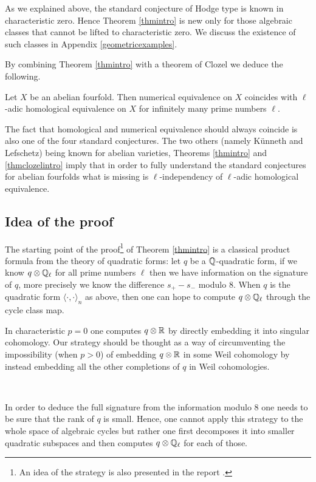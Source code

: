 \documentclass[11pt]{amsart}
\begin{document}
\begin{remark}\label{remintro}
As we explained above, the standard conjecture of Hodge type is known in characteristic zero. Hence Theorem \ref{thmintro} is new only   for those algebraic classes that cannot be lifted to characteristic zero. We discuss the existence of such classes in  Appendix \ref{geometricexamples}.
\end{remark}


By combining Theorem \ref{thmintro} with  a theorem of Clozel  \cite{Clozel} we deduce the following.
\begin{theorem}\label{thmclozelintro}
Let $X$ be an   abelian fourfold. Then numerical equivalence on $X$ coincides with $\ell$-adic homological equivalence on $X$ for infinitely many prime numbers $\ell$. 
\end{theorem}
The fact that homological and numerical equivalence should always coincide is also one   of the four standard conjectures. The two others (namely K\"unneth and Lefschetz) being known for abelian varieties, Theorems \ref{thmintro} and \ref{thmclozelintro} imply that in order to fully understand the standard conjectures for abelian fourfolds what is missing is $\ell$-independency of $\ell$-adic homological equivalence.

\subsection*{Idea of the proof}
The starting point of the proof\footnote{An idea of the strategy is also presented in the report  \cite{Ober}.} of Theorem \ref{thmintro} is a classical product formula from the theory of quadratic forms: let $q$ be a $\mathbb{Q}$-quadratic form, if we know  $q \otimes \mathbb{Q}_\ell$ for all prime numbers $\ell$ then we have information on the signature of $q$, more precisely we know the difference $s_+-s_-$ modulo $8$. When $q$ is the quadratic form  $\langle \cdot, \cdot \rangle_{n}$ as above, then one can hope to compute $q \otimes \mathbb{Q}_\ell$ through the cycle class map.

In characteristic $p=0$ one computes $q \otimes \mathbb{R}$ by directly embedding it into singular cohomology. Our strategy should be thought as a way of circumventing the impossibility (when $p>0$) of embedding $q \otimes \mathbb{R}$ in some Weil cohomology by   instead  embedding all the other completions of   $q$ in  Weil cohomologies.

\



In order to deduce the full signature from the information modulo $8$ one needs to be sure that the rank of $q$ is small. Hence, one cannot apply this strategy to the whole space of algebraic cycles but rather one first decomposes it into smaller quadratic subspaces and then computes $q \otimes \mathbb{Q}_\ell$  for each of those.
\end{document}
